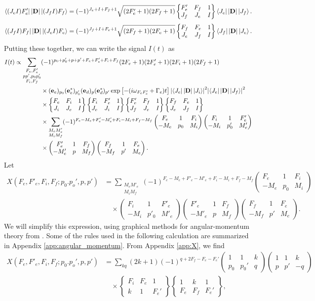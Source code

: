 \documentclass[11pt]{article}
\newcommand{\F}{\mathcal{F}}
\newcommand{\lb}{\left[}
\newcommand{\rb}{\right]}
\newcommand{\tj}[6]{ \begin{pmatrix}
		#1 & #2 & #3 \\
		#4 & #5 & #6 
\end{pmatrix}}
\newcommand{\Gj}[6]{ \begin{Bmatrix}
		#1 & #2 & #3 \\
		#4 & #5 & #6 
\end{Bmatrix}}
\begin{document}
\begin{align*}
\bra{(J_e I)F_e'}\abs{\mathbf{D}} \ket{(J_f I)F_f}
= (-1)^{J_e + I + F_f + 1}\sqrt{(2F'_e + 1)(2F_f+1)} 
\Gj{F'_e}{F_f}{1}{J_f}{J_e}{I}\bra{J_e}\abs{\mathbf{D}} \ket{J_f}.
\end{align*}
\begin{align*}
\bra{(J_f I)F_f} \abs{\mathbf{D}} \ket{(J_e I)F_e}
= (-1)^{J_f + I + F_e + 1}\sqrt{(2F_f + 1)(2F_e+1)} 
\Gj{F_f}{F_e}{1}{J_e}{J_f}{I}\bra{J_f}\abs{\mathbf{D}} \ket{J_e}.
\end{align*}
Putting these together, we can write the signal $I(t)$ as
\begin{align}\label{eq:I(t)}
I(t) 
\propto 
\sum_{\substack{F_e, F'_e\\pp', p_0p'_0\\F_i, F_f}}
&(-1)^{p_0 + p'_0 + p + p' + F_e + F_e' + F_i + F_f}
(2F_e + 1)(2F'_e+1)(2F_i + 1)(2F_f+1)\nonumber\\
& \times (\mathbf{e}_e)_{p_0}(\mathbf{e}^*_e)_{p_0'}(\mathbf{e}_d)_{p}(\mathbf{e}_d^*)_{p'} \exp\lb -(i\omega_{F_eF'_e} + \Gamma_e)t \rb\abs{\bra{J_e} \abs{\mathbf{D}}\ket{J_i}}^2\abs{ \bra{J_e} \abs{\mathbf{D}} \ket{J_f}}^2\nonumber\\
&\times \Gj{F_e}{F_i}{1}{J_i}{J_e}{I}\Gj{F_i}{F'_e}{1}{J_e}{J_i}{I}\Gj{F'_e}{F_f}{1}{J_f}{J_e}{I}\Gj{F_f}{F_e}{1}{J_e}{J_f}{I}\nonumber\\
&\times \sum_{\substack{M_eM'_e\\ M_i M_f}}(-1)^{F_e - M_e + F'_e - M'_e + F_i - M_i + F_f - M_f} \tj{F_e}{1}{F_i}{-M_e}{p_0}{M_i}\tj{F_i}{1}{F'_e}{-M_i}{p'_0}{M'_e}\nonumber\\
&\times \tj{F'_e}{1}{F_f}{-M'_e}{p}{M_f}\tj{F_f}{1}{F_e}{-M_f}{p'}{M_e}.
\end{align}
Let 
\begin{align*}
X(F_e,F'_e,F_i,F_f;p_0.p_o',p,p') &= \sum_{\substack{M_eM'_e\\ M_i M_f}}(-1)^{F_e - M_e + F'_e - M'_e + F_i - M_i + F_f - M_f} \tj{F_e}{1}{F_i}{-M_e}{p_0}{M_i}\\ 
&\quad \times 
\tj{F_i}{1}{F'_e}{-M_i}{p'_0}{M'_e}
\tj{F'_e}{1}{F_f}{-M'_e}{p}{M_f}
\tj{F_f}{1}{F_e}{-M_f}{p'}{M_e}.
\end{align*}
We will simplify this expression, using graphical methods for angular-momentum theory from \cite{angular_momentum}. Some of the rules used in the following calculation are summarized in Appendix \ref{app:angular_momentum}. From Appendix \ref{app:X}, we find 
\begin{align*}
X(F_e,F'_e,F_i,F_f;p_0.p_o',p,p') 
&= \sum_{kq} (2k+1) 
(-1)^{q + 2F_f - F_e -F_e'}
\tj{1}{1}{k}{p_0}{p_0'}{q}\tj{1}{1}{k}{p}{p'}{-q}  \\
&\quad\times \Gj{F_i}{F_e}{1}{k}{1}{F_e'} \Gj{1}{k}{1}{F_e}{F_f}{F_e'},
\end{align*}
\end{document}
